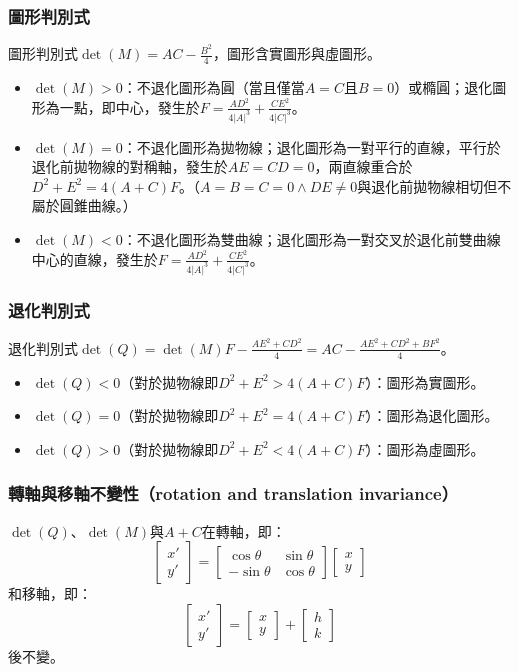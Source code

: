 \documentclass[a4paper,12pt]{article}
\begin{document}
\subsubsection{圖形判別式}
圖形判別式$\det(M)=AC-\frac{B^2}{4}$，圖形含實圖形與虛圖形。
\begin{itemize}
\item $\det(M)>0$：不退化圖形為圓（當且僅當$A=C$且$B=0$）或橢圓；退化圖形為一點，即中心，發生於$F=\frac{AD^2}{4|A|^3}+\frac{CE^2}{4|C|^3}$。
\item $\det(M)=0$：不退化圖形為拋物線；退化圖形為一對平行的直線，平行於退化前拋物線的對稱軸，發生於$AE=CD=0$，兩直線重合於$D^2+E^2=4(A+C)F$。（$A=B=C=0\land DE\neq 0$與退化前拋物線相切但不屬於圓錐曲線。）
\item $\det(M)<0$：不退化圖形為雙曲線；退化圖形為一對交叉於退化前雙曲線中心的直線，發生於$F=\frac{AD^2}{4|A|^3}+\frac{CE^2}{4|C|^3}$。
\end{itemize}
\subsubsection{退化判別式}
退化判別式$\det(Q)=\det(M)F-\frac{AE^2+CD^2}{4}=AC-\frac{AE^2+CD^2+BF^2}{4}$。
\begin{itemize}
\item $\det(Q)<0$（對於拋物線即$D^2+E^2>4(A+C)F$）：圖形為實圖形。
\item $\det(Q)=0$（對於拋物線即$D^2+E^2=4(A+C)F$）：圖形為退化圖形。
\item $\det(Q)>0$（對於拋物線即$D^2+E^2<4(A+C)F$）：圖形為虛圖形。
\end{itemize}
\subsubsection{轉軸與移軸不變性（rotation and translation invariance）}
$\det(Q)$、$\det(M)$與$A+C$在轉軸，即：
\[\begin{bmatrix} x' \\ y' \end{bmatrix} = \begin{bmatrix} \cos\theta & \sin\theta \\ -\sin\theta & \cos\theta \end{bmatrix}\begin{bmatrix} x \\ y \end{bmatrix}\]
和移軸，即：
\[\begin{bmatrix} x' \\ y' \end{bmatrix} = \begin{bmatrix} x \\ y \end{bmatrix}+\begin{bmatrix} h \\ k \end{bmatrix}\]
後不變。
\end{document}

